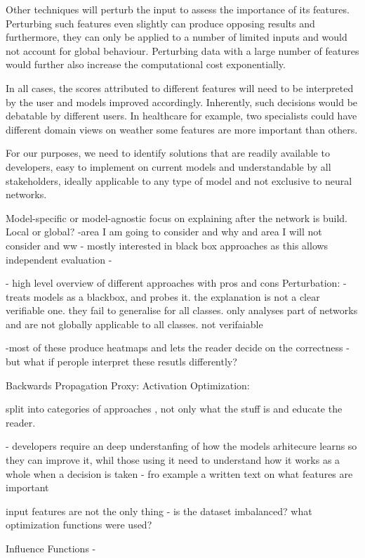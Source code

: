 \documentclass[proposal]{softeng}
\begin{document}
Other techniques will perturb the input to assess the importance of its features. Perturbing such features even slightly can produce opposing results and furthermore, they can only be applied to a number of limited inputs and would not account for global behaviour. Perturbing data with a large number of features would further also increase the computational cost exponentially.

In all cases, the scores attributed to different features will need to be interpreted by the user and models improved accordingly. Inherently, such decisions would be debatable by different users. In healthcare for example, two specialists could have different domain views on weather some features are more important than others.

For our purposes, we need to identify solutions that are readily available to developers, easy to implement on current models and understandable by all stakeholders, ideally applicable to any type of model and not exclusive to neural networks.

Model-specific or model-agnostic
focus on explaining after the network is build.
Local or global?
-area I am going to consider and why and area I will not consider and ww
- mostly interested in black box approaches as this allows independent evaluation
-

- high level overview of different approaches with pros and cons
Perturbation: 
- treats models as a blackbox, and probes it. the explanation is not a clear verifiable one. they fail to generalise for all classes. only analyses part of networks and are not globally applicable to all classes. not verifaiable 

-most of these produce heatmaps and lets the reader decide on the correctness - but what if perople interpret these resutls differently?

Backwards Propagation
Proxy: 
Activation Optimization:

split into categories of approaches , not only what the stuff is and educate the reader.

- developers require an deep understanfing of how the models arhitecure learns so they can improve it, whil those using it need to understand how it works as a whole when a decision is taken - fro example a written text on what features are important 

input features are not the only thing - is the dataset imbalanced? what optimization functions were used?

Influence Functions -
\end{document}
